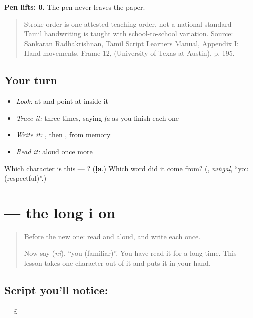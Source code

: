 \textbf{Pen lifts: 0.} The pen never leaves the paper.

\begin{quote}
Stroke order is one attested teaching order, not a national standard — Tamil handwriting is taught with school-to-school variation. Source: Sankaran Radhakrishnan, Tamil Script Learners Manual, Appendix I: Hand-movements, Frame 12,  (University of Texas at Austin), p. 195.
\end{quote}

\subsection*{Your turn}
\begin{itemize}
\raggedright
  \item \emph{Look:} at \textbf{} and point at  inside it
  \item \emph{Trace it:}  three times, saying \emph{ḷa} as you finish each one
  \item \emph{Write it:} , then , from memory
  \item \emph{Read it:} \textbf{} aloud once more
\end{itemize}

\begin{tcolorbox}[breakable,colback=teal!4,colframe=teal!35!black,title={Before you move on}]
Which character is this — ? (\textbf{ḷa}.) Which word did it come from? (\textbf{}, \emph{nīṅgaḷ}, \textquotedblleft{}you (respectful)\textquotedblright{}.)
\end{tcolorbox}
\section[\texorpdfstring{\ta{ீ} (ī)}{ீ (ī)}]{ — the long i on }

\label{lesson:TA-S132-vowel-sign-ii}



\begin{quote}
Before the new one: read  and  aloud, and write each once.

Now say \textbf{} (\emph{nī}), \textquotedblleft{}you (familiar)\textquotedblright{}. You have read it for a long time. This lesson takes one character out of it and puts it in your hand.
\end{quote}

\subsection*{Script you'll notice: }
\textbf{} — \emph{ī}.

